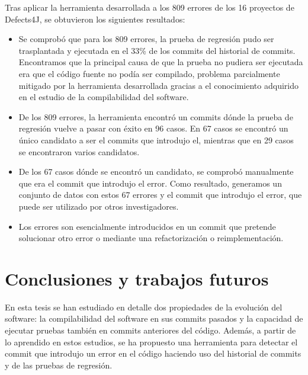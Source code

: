 Tras aplicar la herramienta desarrollada a los 809 errores de los 16 proyectos de Defects4J, se obtuvieron los siguientes resultados:

\begin{itemize}
    \item Se comprobó que para los 809 errores, la prueba de regresión pudo ser trasplantada y ejecutada en el 33\% de los commits del historial de commits.
    Encontramos que la principal causa de que la prueba no pudiera ser ejecutada era que el código fuente no podía ser compilado, problema parcialmente mitigado por la herramienta desarrollada gracias a el conocimiento adquirido en el estudio de la compilabilidad del software.
    \item De los 809 errores, la herramienta encontró un commits dónde la prueba de regresión vuelve a pasar con éxito en 96 casos. En 67 casos se encontró un único candidato a ser el commits que introdujo el, mientras que en 29 casos se encontraron varios candidatos.
    \item De los 67 casos dónde se encontró un candidato, se comprobó manualmente que era el commit que introdujo el error. 
    Como resultado, generamos un conjunto de datos con estos 67 errores y el commit que introdujo el error, que puede ser utilizado por otros investigadores.
    \item Los errores son esencialmente introducidos en un commit que pretende solucionar otro error o mediante una refactorización o reimplementación.
\end{itemize}

\section{Conclusiones y trabajos futuros}
\label{sec:resumen:conclusiones}

En esta tesis se han estudiado en detalle dos propiedades de la evolución del software: la compilabilidad del software en sus commits pasados y la capacidad de ejecutar pruebas también en commits anteriores del código. 
Además, a partir de lo aprendido en estos estudios, se ha propuesto una herramienta para detectar el commit que introdujo un error en el código haciendo uso del historial de commits y de las pruebas de regresión. 

